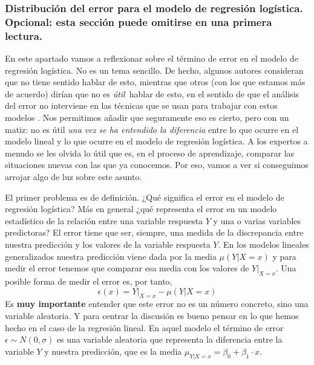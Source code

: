 	
	\subsubsection*{Distribución del error para el modelo de regresión logística.\\
		Opcional: esta sección puede omitirse en una primera lectura.}
	\label{cap13:subsubsec:DistribucionErrorRegresionLogistica}
	
	En este apartado vamos a reflexionar sobre el término de error en el modelo de regresión logística. No es un tema sencillo. De hecho, algunos autores consideran que no tiene sentido hablar de esto, mientras que otros (con los que estamos más de acuerdo) dirían que no es {\em útil}\,  hablar de esto, en el sentido de que el análisis del error no interviene en las técnicas que se usan para trabajar con estos modelos . Nos permitimos añadir que seguramente eso es cierto, pero con un matiz: no es útil {\em una vez se ha entendido la diferencia} entre lo que ocurre en el modelo lineal y lo que ocurre en el modelo de regresión logística. A los expertos a menudo se les olvida lo útil que es, en el proceso de aprendizaje, comparar las situaciones nuevas con las que ya conocemos. Por eso, vamos a ver si conseguimos arrojar algo de luz sobre este asunto.
	
	El primer problema es de definición. ¿Qué significa el error en el modelo de regresión logística? Más en general ¿qué representa el error en un modelo estadístico de la relación entre una variable respuesta $Y$ y una o varias variables predictoras? El error tiene que ser, siempre, una medida de la discrepancia entre nuestra predicción y los valores de la variable respuesta $Y$. En los modelos lineales generalizados nuestra predicción viene dada por la media $\mu(Y|X=x)$ y para medir el error tenemos que comparar esa media con los valores de $Y|_{X=x}$. Una posible forma de medir el error es, por tanto,
	\[
	\epsilon(x) = Y|_{X=x} - \mu(Y|X=x)
	\]
	Es {\bf muy importante} entender que este error no es un número concreto, sino una variable aleatoria. Y para centrar la discusión es bueno pensar en lo que hemos hecho en el caso de la regresión lineal. En aquel modelo el término de error $\epsilon\sim N(0,\sigma)$ es una variable aleatoria que representa la diferencia entre  la variable $Y$ y nuestra predicción, que es la media $\mu_{Y|X=x} = \beta_0 +\beta_1\cdot x$.
	
